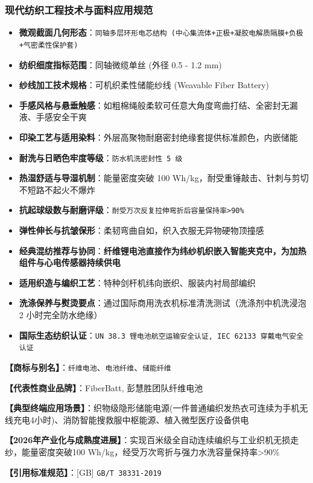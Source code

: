 \documentclass[11pt,openright,twoside,UTF8]{ctexbook}
\begin{document}
\subsubsection*{现代纺织工程技术与面料应用规范}
\begin{itemize} \setlength{\itemsep}{2pt}
    \item \textbf{微观截面几何形态}：\texttt{同轴多层环形电芯结构 (中心集流体+正极+凝胶电解质隔膜+负极+气密柔性保护套)}
    \item \textbf{纺织细度指标范围}：同轴微缆单丝 (外径 0.5 - 1.2 mm)
    \item \textbf{纱线加工技术规格}：可机织柔性储能纱线 (Weavable Fiber Battery)
    \item \textbf{手感风格与悬垂触感}：如粗棉绳般柔软可任意大角度弯曲打结、全密封无漏液、手感安全干爽
    \item \textbf{印染工艺与适用染料}：外层高聚物耐磨密封绝缘套提供标准颜色，内嵌储能
    \item \textbf{耐洗与日晒色牢度等级}：\texttt{防水机洗密封性 5 级}
    \item \textbf{热湿舒适与导湿机制}：能量密度突破 100 Wh/kg，耐受重锤敲击、针刺与剪切不短路不起火不爆炸
    \item \textbf{抗起球级数与耐磨评级}：\texttt{耐受万次反复拉伸弯折后容量保持率\textgreater{}90\%}
    \item \textbf{弹性伸长与抗皱保形}：柔韧弯曲自如，织入衣服无异物硬物顶撞感
    \item \textbf{经典混纺推荐与协同}：\textbf{纤维锂电池直接作为纬纱机织嵌入智能夹克中，为加热组件与心电传感器持续供电}
    \item \textbf{适用织造与编织工艺}：特种剑杆机纬向嵌织、服装内衬局部编织
    \item \textbf{洗涤保养与熨烫要点}：通过国际商用洗衣机标准清洗测试（洗涤剂中机洗浸泡 2 小时完全防水绝缘）
    \item \textbf{国际生态纺织认证}：\texttt{UN 38.3 锂电池航空运输安全认证, IEC 62133 穿戴电气安全认证}
\end{itemize}
\vspace{0.2cm}

\noindent\textbf{【商标与别名】}：\texttt{纤维电池}、\texttt{电池纤维}、\texttt{储能纤维}\par
\noindent\textbf{【代表性商业品牌】}：FiberBatt, 彭慧胜团队纤维电池\par
\noindent\textbf{【典型终端应用场景】}：织物级隐形储能电源(一件普通编织发热衣可连续为手机无线充电4小时)、消防智能搜救服中枢能源、植入微型医疗设备供电\par
\noindent\textbf{【2026年产业化与成熟度进展】}：实现百米级全自动连续编织与工业织机无损走纱，能量密度突破100 Wh/kg，经受万次弯折与强力水洗容量保持率\textgreater{}90\%\par
\noindent\textbf{【引用标准规范】}：[GB] \texttt{GB/T 38331-2019}\par
\vspace{0.5cm}
\end{document}
